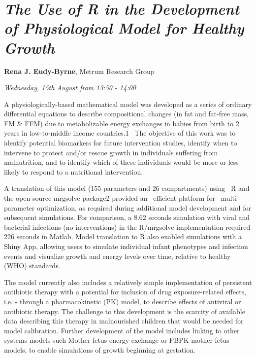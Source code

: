 \documentclass[]{book}
\theoremstyle{definition}
\theoremstyle{definition}
\theoremstyle{definition}
\theoremstyle{remark}
\begin{document}
\hypertarget{the-use-of-r-in-the-development-of-physiological-model-for-healthy-growth}{%
\section{\texorpdfstring{\emph{The Use of R in the Development of
Physiological Model for Healthy
Growth}}{The Use of R in the Development of Physiological Model for Healthy Growth}}\label{the-use-of-r-in-the-development-of-physiological-model-for-healthy-growth}}

\textbf{Rena J. Eudy-Byrne}, Metrum Research Group

\emph{Wednesday, 15th August from 13:50 - 14:00}

A physiologically-based mathematical model was developed as a series of
ordinary differential equations to describe compositional changes (in
fat and fat-free mass, FM \& FFM) due to metabolizable energy exchanges
in babies from birth to 2 years in low-to-middle income countries.1 ~The
objective of this work was to identify potential biomarkers for future
intervention studies, identify when to intervene to protect and/or
rescue growth in individuals suffering from malnutrition, and to
identify which of these individuals would be more or less likely to
respond to a nutritional intervention.

A translation of this model (155 parameters and 26 compartments) using
~R and the open-source mrgsolve package2 provided an ~efficient platform
for ~multi-parameter optimization, as required during additional model
development and for subsequent simulations. For comparison, a 8.62
seconds simulation with viral and bacterial infections (no
interventions) in the R/mrgsolve implementation required 226 seconds in
Matlab. Model translation to R also enabled simulations with a Shiny
App, allowing users to simulate individual infant phenotypes and
infection events and visualize growth and energy levels over time,
relative to healthy (WHO) standards.

The model currently also includes a relatively simple implementation of
persistent antibiotic therapy with a potential for inclusion of drug
exposure-related effects, i.e. - through a pharmacokinetic (PK) model,
to describe effects of antiviral or antibiotic therapy. The challenge to
this development is the scarcity of available data describing this
therapy in malnourished children that would be needed for model
calibration. Further development of the model includes linking to other
systems models such Mother-fetus energy exchange or PBPK mother-fetus
models, to enable simulations of growth beginning at gestation.
\end{document}
